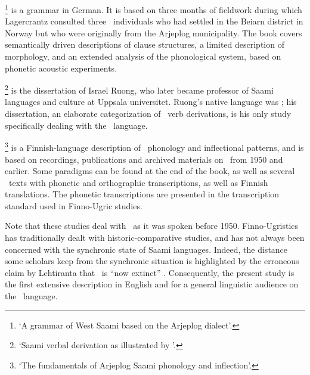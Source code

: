 \footnote{‘A grammar of West Saami based on the Arjeplog dialect’.} \citep{Lagercrantz1926} 
is a grammar in German. It is based on three months of fieldwork during which Lagercrantz consulted three \PS\ individuals who had settled in the Beiarn district in Norway but who were originally from the Arjeplog municipality. The book covers semantically driven descriptions of clause structures, a limited description of morphology, and an extended analysis of the phonological system, based on phonetic acoustic experiments. 

\footnote{‘Saami verbal derivation as illustrated by \PS’.} \citep{Ruong1943} is the dissertation of Israel Ruong, who later became professor of Saami languages and culture at Uppsala universitet. Ruong’s native language was \PS; his dissertation, an elaborate categorization of \PS\ verb derivations, is his only study specifically dealing with the \PS\ language. %

\footnote{‘The fundamentals of Arjeplog Saami phonology and inflection’.} \citep{Lehtiranta1992} is a Fin\-nish-language description of \PS\ phonology and inflectional patterns, and is based on recordings, publications and archived materials on \PS\ from 1950 and earlier. Some paradigms can be found at the end of the book, as well as several \PS\ texts with phonetic and orthographic transcriptions, as well as Finnish translations. The phonetic transcriptions are presented in the transcription standard used in Finno-Ugric studies. 

Note that these studies deal with \PS\ as it was spoken before 1950. Finno-Ugristics has traditionally dealt with historic-comparative studies, and has not always been concerned with the synchronic state of Saami languages. Indeed, the distance some scholars keep from the synchronic situation is highlighted by the erroneous claim by Lehtiranta %
that \PS\ is “now extinct” \citep[English abstract]{Lehtiranta1992}. 
Consequently, the present study is the first extensive description in English and for a general linguistic audience on the \PS\ language. %

